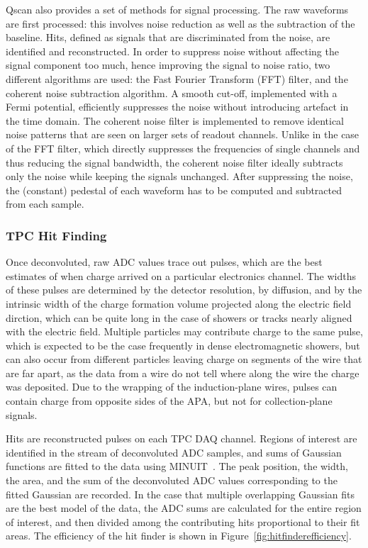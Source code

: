 Qscan also provides a set of methods for signal processing. 
The raw waveforms are first processed: this involves noise reduction as well as the subtraction of the baseline.
Hits, defined as signals that are discriminated from the noise, are identified and reconstructed.
In order to suppress noise without affecting the signal component too much, hence improving the signal to noise ratio, 
two different algorithms are used: the Fast Fourier Transform (FFT) filter, and the coherent noise subtraction algorithm.
A smooth cut-off, implemented with a Fermi potential, efficiently suppresses the noise without introducing artefact in the
time domain.
The coherent noise filter is implemented to remove identical noise patterns that are seen on larger sets of readout channels. 
Unlike in the case of the FFT filter, which directly suppresses the frequencies of single channels and thus reducing the signal bandwidth, the coherent noise filter ideally subtracts only the noise while keeping the signals unchanged.
After suppressing the noise, the (constant) pedestal of each waveform has to be computed and subtracted from each sample.


\subsubsection{TPC Hit Finding}

Once deconvoluted, raw ADC values trace out pulses, which are the best
estimates of when charge arrived on a particular electronics channel.
The widths of these pulses are determined by the detector resolution,
by diffusion, and by the intrinsic width of the charge formation
volume projected along the electric field dirction, which can be quite
long in the case of showers or tracks nearly aligned with the electric
field.  Multiple particles may contribute charge to the same pulse,
which is expected to be the case frequently in dense electromagnetic
showers, but can also occur from different particles leaving charge on
segments of the wire that are far apart, as the data from a wire do
not tell where along the wire the charge was deposited.  
Due to the wrapping of the induction-plane wires, pulses can contain charge
from opposite sides of the APA, but not for collection-plane signals.

Hits are reconstructed pulses on each TPC DAQ channel.  Regions of
interest are identified in the stream of deconvoluted ADC samples, and
sums of Gaussian functions are fitted to the data using
MINUIT~\cite{minuit}.  The peak position, the width, the area, and the
sum of the deconvoluted ADC values corresponding to the fitted
Gaussian are recorded.  In the case that multiple overlapping Gaussian
fits are the best model of the data, the ADC sums are calculated for
the entire region of interest, and then divided among the contributing
hits proportional to their fit areas.  The efficiency of the hit
finder is shown in Figure~\ref{fig:hitfinderefficiency}.

